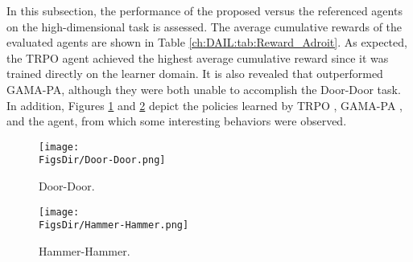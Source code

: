 In this subsection, the performance of the proposed \DAIL{} versus the referenced agents on the high-dimensional task is assessed.
The average cumulative rewards of the evaluated agents are shown in Table \ref{ch:DAIL:tab:Reward_Adroit}.
As expected, the TRPO agent achieved the highest average cumulative reward since it was trained directly on the learner domain.
It is also revealed that \DAIL{} outperformed GAMA-PA, although they were both unable to accomplish the Door-Door task.
In addition, Figures \ref{ch:DAIL:fig:DoorDoor} and \ref{ch:DAIL:fig:HammerHammer} depict the policies learned by TRPO \cite{RL_TRPO}, GAMA-PA \cite{DAIL_Model_DAIL}, and the \DAIL{} agent, from which some interesting behaviors were observed.

\begin{table}[htbp!]
  \centering
  \caption{}
  \label{ch:DAIL:tab:Reward_Adroit}
  
\end{table}

\begin{landscape}
  \begin{figure}[htbp!]
    \centering
    \texttt{[image:  \\FigsDir/Door-Door.png]}
    \caption{Door-Door.}
    \label{ch:DAIL:fig:DoorDoor}
  \end{figure}
\end{landscape}

\begin{landscape}
  \begin{figure}[htbp!]
    \centering
    \texttt{[image:  \\FigsDir/Hammer-Hammer.png]}
    \caption{Hammer-Hammer.}
    \label{ch:DAIL:fig:HammerHammer}
  \end{figure}
\end{landscape}

